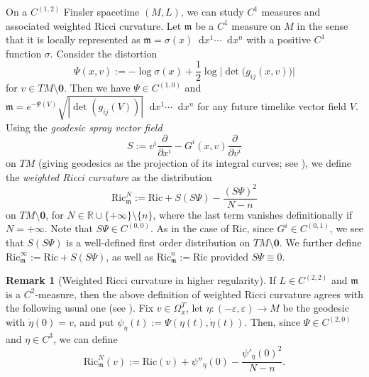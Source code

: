 \documentclass[a4paper,11pt]{article}
\numberwithin{equation}{section}
\theoremstyle{definition}
\newtheorem{Remark}[Definition]{Remark}
\theoremstyle{plain}
\newcommand{\eps}{\varepsilon}
\newcommand{\Ric}{\mathrm{Ric}}
\newcommand*\diff{\mathop{}\!\mathrm{d}}
\begin{document}
On a $C^{(1,2)}$ Finsler spacetime $(M,L)$, we can study $C^1$ measures and associated weighted Ricci curvature. 
Let $\mathfrak m$ be a $C^1$ measure on $M$ in the sense that it is locally represented as $\mathfrak m = \sigma(x) \diff x^1 \cdots \diff x^n$ with a positive $C^1$ function $\sigma$. 
Consider the distortion
\begin{equation*}
    \Psi(x,v):= - \log \sigma(x) + \frac{1}{2} \log \bigl| \det \bigl(g_{ij}(x,v) \bigr) \bigr|
\end{equation*}
for $v \in TM \setminus \mathbf 0$.
Then we have $\Psi \in C^{(1,0)}$ and $\mathfrak m =e^{-\Psi(V)} \sqrt{|\det (g_{ij}(V))|} \diff x^1 \cdots \diff x^n$ for any future timelike vector field $V$. 
Using the \emph{geodesic spray vector field} 
\begin{equation*}
    S:= v^i \frac{\partial}{\partial x^i} - G^i(x,v) \frac{\partial}{\partial v^i}
\end{equation*}
on $TM$ (giving geodesics as the projection of its integral curves; see \cite{Shspray}), we define the \emph{weighted Ricci curvature} as the distribution
\begin{equation*} 
    \Ric_{\mathfrak m}^N := \Ric + S(S\Psi) - \frac{(S\Psi)^2}{N - n}
\end{equation*}
on $TM \setminus \mathbf 0$, for $N \in \mathbb R \cup \{+\infty\} \setminus \{n\}$, where the last term vanishes definitionally if $N = +\infty$.
Note that $S\Psi \in C^{(0,0)}$. 
As in the case of $\Ric$, since $G^i \in C^{(0,1)}$, we see that $S(S\Psi)$ is a well-defined first order distribution on $TM \setminus \mathbf 0$. 
We further define $\Ric^{\infty}_{\mathfrak m} := \Ric + S(S\Psi)$, as well as $\Ric^n_{\mathfrak m}:=\Ric$ provided $S\Psi \equiv 0$.

\begin{Remark}[Weighted Ricci curvature in higher regularity]
If $L \in C^{(2,2)}$ and $\mathfrak m$ is a $C^2$-measure, then the above definition of weighted Ricci curvature agrees with the following usual one (see \cite{LuMinguzziOhtaSingularity,Ohta2021}).
Fix $v \in \Omega_x^T$, let $\eta:(-\eps,\eps) \to M$ be the geodesic with $\dot{\eta}(0)=v$, and put $\psi_\eta(t):=\Psi(\eta(t),\dot{\eta}(t))$.
Then, since $\Psi \in C^{(2,0)}$ and $\eta \in C^3$, we can define
\[
\Ric^N_{\mathfrak m}(v) :=\Ric(v) +\psi''_\eta(0) -\frac{\psi'_\eta(0)^2}{N-n}.
\]
\end{Remark}
\end{document}
